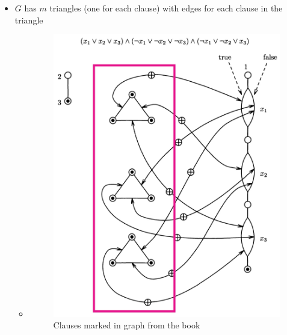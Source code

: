 \documentclass[a4]{scrartcl}
\begin{document}
\begin{itemize}
\item $G$ has $m$ triangles (one for each clause) with edges for each clause in the triangle
\begin{itemize}
\item[]
\begin{figure}[H]
\begin{center}
\includegraphics[scale=0.4]{triangle2.jpg}
\end{center}
\caption{Clauses marked in graph from the book \cite{book}}
\end{figure}
\end{itemize}


\end{itemize}
\end{document}
